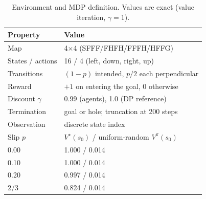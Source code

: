 \begin{table}[t]
\centering
\small
\caption{Environment and MDP definition. Values are exact (value iteration, $\gamma=1$).}
\label{tab:mdp}
\begin{tabular}{ll}
\toprule
Property & Value \\
\midrule
Map & 4$\times$4 (SFFF/FHFH/FFFH/HFFG) \\
States / actions & 16 / 4 (left, down, right, up) \\
Transitions & $(1-p)$ intended, $p/2$ each perpendicular \\
Reward & $+1$ on entering the goal, $0$ otherwise \\
Discount $\gamma$ & 0.99 (agents), 1.0 (DP reference) \\
Termination & goal or hole; truncation at 200 steps \\
Observation & discrete state index \\
\midrule
Slip $p$ & $V^\star(s_0)$ / uniform-random $V^\pi(s_0)$ \\
0.00 & 1.000 / 0.014 \\
0.10 & 1.000 / 0.014 \\
0.20 & 0.997 / 0.014 \\
2/3 & 0.824 / 0.014 \\
\bottomrule
\end{tabular}
\end{table}